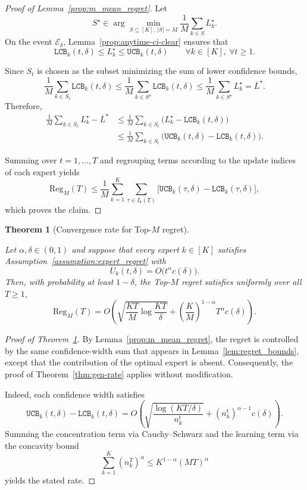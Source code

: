\documentclass[a4paper,14pt]{extarticle}
\theoremstyle{plain}
\newtheorem{theorem}{Theorem}
\newcommand{\LCB}{\texttt{LCB}}
\newcommand{\UCB}{\texttt{UCB}}
\begin{document}
\begin{proof}[Proof of Lemma~\ref{prop:m_mean_regret}]

Let
\[
S^\star
\in
\arg\min_{S\subseteq[K],\,|S|=M}
\frac1M\sum_{k\in S}L_k^\star.
\]
On the event $\mathcal E_\delta$, Lemma~\ref{prop:anytime-ci-clear}
ensures that
\[
\LCB_k(t,\delta)
\le
L_k^\star
\le
\UCB_k(t,\delta)
\qquad
\forall k\in[K],\ \forall t\ge 1.
\]

Since $S_t$ is chosen as the subset minimizing the sum of lower
confidence bounds,
\[
\frac1M\sum_{k\in S_t}\LCB_k(t,\delta)
\le
\frac1M\sum_{k\in S^\star}\LCB_k(t,\delta)
\le
\frac1M\sum_{k\in S^\star}L_k^\star
=
\overline L^\star.
\]
Therefore,
\begin{align}
\frac1M\sum_{k\in S_t}L_k^\star-\overline L^\star
&\le
\frac1M
\sum_{k\in S_t}
\bigl(
L_k^\star-\LCB_k(t,\delta)
\bigr)
\\
&\le
\frac1M
\sum_{k\in S_t}
\bigl(
\UCB_k(t,\delta)-\LCB_k(t,\delta)
\bigr).
\end{align}

Summing over $t=1,\ldots,T$ and regrouping terms according to the update
indices of each expert yields
\[
\mathrm{Reg}_M(T)
\le
\frac1M
\sum_{k=1}^{K}
\sum_{\tau\in I_k(T)}
\bigl[
\UCB_k(\tau,\delta)
-
\LCB_k(\tau,\delta)
\bigr],
\]
which proves the claim.

\end{proof}

\begin{theorem}[Convergence rate for Top-$M$ regret]
\label{thm:gen-rate-topM}

Let $\alpha,\delta\in(0,1)$ and suppose that every expert
$k\in[K]$ satisfies Assumption~\ref{assumption:expert_regret} with
\[
U_k(t,\delta)
=
O\!\bigl(
t^\alpha c(\delta)
\bigr).
\]
Then, with probability at least $1-\delta$, the Top-$M$ regret satisfies
uniformly over all $T\ge1$,
\[
\mathrm{Reg}_M(T)
=
O\!\left(
\sqrt{\frac{KT}{M}\log\frac{KT}{\delta}}
+
\left(\frac{K}{M}\right)^{1-\alpha}
T^\alpha c(\delta)
\right).
\]

\end{theorem}

\begin{proof}[Proof of Theorem~\ref{thm:gen-rate-topM}]

By Lemma~\ref{prop:m_mean_regret}, the regret is controlled by the same
confidence-width sum that appears in Lemma~\ref{lem:regret_bounds},
except that the contribution of the optimal expert is absent.
Consequently, the proof of Theorem~\ref{thm:gen-rate} applies without
modification.

Indeed, each confidence width satisfies
\[
\UCB_k(t,\delta)-\LCB_k(t,\delta)
=
O\!\left(
\sqrt{\frac{\log(KT/\delta)}{n_k^t}}
+
(n_k^t)^{\alpha-1}c(\delta)
\right).
\]
Summing the concentration term via Cauchy--Schwarz and the learning term
via the concavity bound
\[
\sum_{k=1}^{K}(n_k^T)^\alpha
\le
K^{1-\alpha}(MT)^\alpha
\]
yields the stated rate.

\end{proof}
\end{document}
